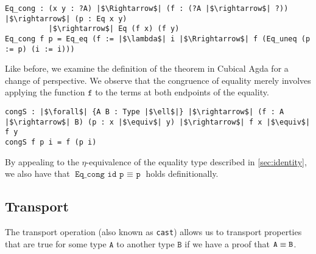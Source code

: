 \documentclass[12pt,twoside,maitrise]{dms}
\theoremstyle{definition}
\numberwithin{equation}{section}
\numberwithin{table}{chapter}
\numberwithin{figure}{chapter}
\newcommand\id[1] {\texttt{#1}}
\newcommand\fn[1] {\texttt{#1}}
\begin{document}
\begin{verbatim}
Eq_cong : (x y : ?A) |$\Rightarrow$| (f : (?A |$\rightarrow$| ?)) |$\rightarrow$| (p : Eq x y)
          |$\rightarrow$| Eq (f x) (f y)
Eq_cong f p = Eq_eq (f := |$\lambda$| i |$\Rrightarrow$| f (Eq_uneq (p := p) (i := i)))
\end{verbatim}

Like before, we examine the definition of the theorem in Cubical Agda for a
change of perspective. We observe that the congruence of equality merely
involves applying the function $\id{f}$ to the terms at both endpoints of the
equality.

\begin{verbatim}
congS : |$\forall$| {A B : Type |$\ell$|} |$\rightarrow$| (f : A |$\rightarrow$| B) (p : x |$\equiv$| y) |$\rightarrow$| f x |$\equiv$| f y
congS f p i = f (p i)
\end{verbatim}

By appealing to the $\eta$-equivalence of the equality type described in
\autoref{sec:identity}, we also have that $\fn{Eq\_cong id p $\equiv$ p}$ holds
definitionally.

\subsection*{Transport}
The transport operation (also known as {\id{cast}}) allows us to transport
properties that are true for some type $\id{A}$ to another type $\id{B}$ if we
have a proof that $\eqtype{\id{A}}{\id{B}}$.

\end{document}
